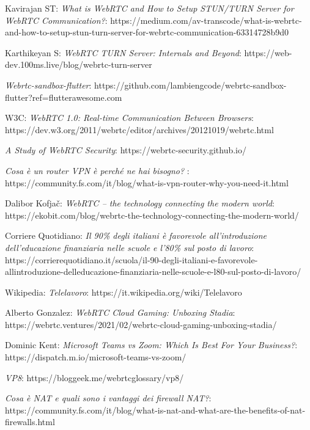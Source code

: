 \documentclass[11pt, a4paper, openany]{book}
\begin{document}
\begin{thebibliography}{9}
  		Kavirajan ST: \emph{What is WebRTC and How to Setup STUN/TURN Server for WebRTC Communication?}:
  		https://medium.com/av-transcode/what-is-webrtc-and-how-to-setup-stun-turn-server-for-webrtc-communication-63314728b9d0
  		
  		Karthikeyan S: \emph{WebRTC TURN Server: Internals and Beyond}:
  		https://web-dev.100ms.live/blog/webrtc-turn-server
  		
  		\emph{Webrtc-sandbox-flutter}:
		https://github.com/lambiengcode/webrtc-sandbox-flutter?ref=flutterawesome.com
 		
 		W3C: \emph{WebRTC 1.0: Real-time Communication Between Browsers}:
 		https://dev.w3.org/2011/webrtc/editor/archives/20121019/webrtc.html	
 		
 		\emph{A Study of WebRTC Security}:
 		https://webrtc-security.github.io/
 		
 		\emph{Cosa è un router VPN è perché ne hai bisogno? }: 		https://community.fs.com/it/blog/what-is-vpn-router-why-you-need-it.html
 		
 		Dalibor Kofjač: \emph{WebRTC – the technology connecting the modern world}:
 		https://ekobit.com/blog/webrtc-the-technology-connecting-the-modern-world/
 		
 		Corriere Quotidiano: \emph{Il 90\% degli italiani è favorevole all’introduzione dell’educazione finanziaria nelle scuole e l’80\% sul posto di lavoro}:
 		https://corrierequotidiano.it/scuola/il-90-degli-italiani-e-favorevole-allintroduzione-delleducazione-finanziaria-nelle-scuole-e-l80-sul-posto-di-lavoro/
 		
 		Wikipedia: \emph{Telelavoro}:
 		https://it.wikipedia.org/wiki/Telelavoro
 		
 		Alberto Gonzalez: \emph{WebRTC Cloud Gaming: Unboxing Stadia}:
 		https://webrtc.ventures/2021/02/webrtc-cloud-gaming-unboxing-stadia/
 		
 		Dominic Kent: \emph{Microsoft Teams vs Zoom: Which Is Best For Your Business?}:
 		https://dispatch.m.io/microsoft-teams-vs-zoom/
 		 		
 		\emph{VP8}:		
 		https://bloggeek.me/webrtcglossary/vp8/
 		
 		\emph{Cosa è NAT e quali sono i vantaggi dei firewall NAT?}: 
 		https://community.fs.com/it/blog/what-is-nat-and-what-are-the-benefits-of-nat-firewalls.html
 		

\end{thebibliography}
\end{document}
